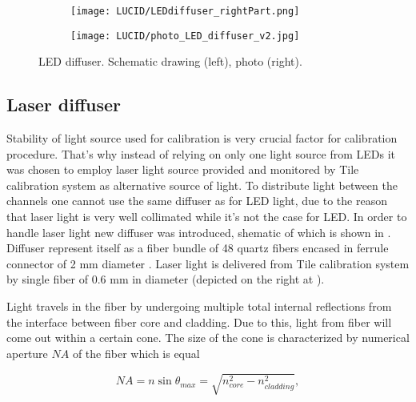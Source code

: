 \begin{figure}
\begin{subfigure}{.48\textwidth}
  \centering
  \texttt{[image: LUCID/LEDdiffuser\_rightPart.png]}
\end{subfigure}
\begin{subfigure}{.48\textwidth}
  \centering
  \texttt{[image: LUCID/photo\_LED\_diffuser\_v2.jpg]}
\end{subfigure}

\caption{LED diffuser. Schematic drawing (left), photo (right).}
\label{fig:LEDDiffuser}
\end{figure}


\subsection{Laser diffuser}
\label{subsec:laserDiffuser}


Stability of light source used for calibration is very crucial factor for calibration procedure.
That's why instead of relying on only one light source from LEDs it was chosen to employ laser light source 
provided and monitored by Tile calibration system \cite{atlasGeneral} as alternative source of light. 
To distribute light between the channels one cannot use the same diffuser as for LED light, 
due to the reason that laser light is very well collimated while it's not the case for LED.
In order to handle laser light new diffuser was introduced, shematic of which is shown in .
Diffuser represent itself as a fiber bundle of 48 quartz fibers encased in ferrule connector of 2 mm diameter .
Laser light is delivered from Tile calibration system by single fiber of 0.6 mm in diameter (depicted on the right at ).

Light travels in the fiber by undergoing multiple total internal reflections from the interface between fiber core and cladding. 
Due to this, light from fiber will come out within a certain cone. The size of the cone is characterized by numerical aperture $NA$ of the fiber which is equal

\begin{equation}
\label{eq:numericalApperture}
 NA = n \sin{\theta_{max}} = \sqrt{n_{core}^2 - n_{cladding}^2},
\end{equation}

